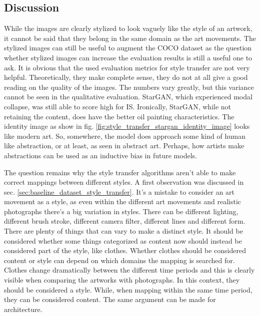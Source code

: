 \subsection{Discussion}
\label{sec:baseline_discussion_style_transfer}
While the images are clearly stylized to look vaguely like the style of an artwork, it cannot be said that they belong in the same domain as the art movements.
The stylized images can still be useful to augment the COCO dataset as the question whether stylized images can increase the evaluation results is still a useful one to ask.
It is obvious that the used evaluation metrics for style transfer are not very helpful.
Theoretically, they make complete sense, they do not at all give a good reading on the quality of the images.
The numbers vary greatly, but this variance cannot be seen in the qualitative evaluation.
StarGAN, which experienced modal collapse, was still able to score high for \gls{IS}.
Ironically, StarGAN, while not retaining the content, does have the better oil painting characteristics.
The identity image as show in fig. \ref{fig:style_transfer_stargan_identity_image} looks like modern art.
So, somewhere, the model does approach some kind of human like abstraction, or at least, as seen in abstract art.
Perhaps, how artists make abstractions can be used as an inductive bias in future models.

The question remains why the style transfer algorithms aren't able to make correct mappings between different styles.
A first observation was discussed in sec. \ref{sec:baseline_dataset_style_transfer}.
It's a mistake to consider an art movement as a style, as even within the different art movements and realistic photographs there's a big variation in styles.
There can be different lighting, different brush stroke, different camera filter, different lines and different form.
There are plenty of things that can vary to make a distinct style.
It should be considered whether some things categorized as content now should instead be considered part of the style, like clothes.
Whether clothes should be considered content or style can depend on which domains the mapping is searched for.
Clothes change dramatically between the different time periods and this is clearly visible when comparing the artworks with photographs.
In this context, they should be considered a style.
While, when mapping within the same time period, they can be considered content.
The same argument can be made for architecture.

